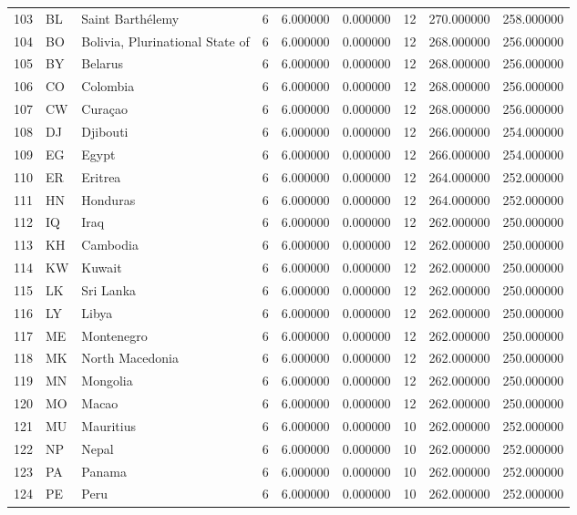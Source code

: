 \begin{tabular}{lllrrrrrr}
103 & BL & Saint Barthélemy & 6 & 6.000000 & 0.000000 & 12 & 270.000000 & 258.000000 \\
104 & BO & Bolivia, Plurinational State of & 6 & 6.000000 & 0.000000 & 12 & 268.000000 & 256.000000 \\
105 & BY & Belarus & 6 & 6.000000 & 0.000000 & 12 & 268.000000 & 256.000000 \\
106 & CO & Colombia & 6 & 6.000000 & 0.000000 & 12 & 268.000000 & 256.000000 \\
107 & CW & Curaçao & 6 & 6.000000 & 0.000000 & 12 & 268.000000 & 256.000000 \\
108 & DJ & Djibouti & 6 & 6.000000 & 0.000000 & 12 & 266.000000 & 254.000000 \\
109 & EG & Egypt & 6 & 6.000000 & 0.000000 & 12 & 266.000000 & 254.000000 \\
110 & ER & Eritrea & 6 & 6.000000 & 0.000000 & 12 & 264.000000 & 252.000000 \\
111 & HN & Honduras & 6 & 6.000000 & 0.000000 & 12 & 264.000000 & 252.000000 \\
112 & IQ & Iraq & 6 & 6.000000 & 0.000000 & 12 & 262.000000 & 250.000000 \\
113 & KH & Cambodia & 6 & 6.000000 & 0.000000 & 12 & 262.000000 & 250.000000 \\
114 & KW & Kuwait & 6 & 6.000000 & 0.000000 & 12 & 262.000000 & 250.000000 \\
115 & LK & Sri Lanka & 6 & 6.000000 & 0.000000 & 12 & 262.000000 & 250.000000 \\
116 & LY & Libya & 6 & 6.000000 & 0.000000 & 12 & 262.000000 & 250.000000 \\
117 & ME & Montenegro & 6 & 6.000000 & 0.000000 & 12 & 262.000000 & 250.000000 \\
118 & MK & North Macedonia & 6 & 6.000000 & 0.000000 & 12 & 262.000000 & 250.000000 \\
119 & MN & Mongolia & 6 & 6.000000 & 0.000000 & 12 & 262.000000 & 250.000000 \\
120 & MO & Macao & 6 & 6.000000 & 0.000000 & 12 & 262.000000 & 250.000000 \\
121 & MU & Mauritius & 6 & 6.000000 & 0.000000 & 10 & 262.000000 & 252.000000 \\
122 & NP & Nepal & 6 & 6.000000 & 0.000000 & 10 & 262.000000 & 252.000000 \\
123 & PA & Panama & 6 & 6.000000 & 0.000000 & 10 & 262.000000 & 252.000000 \\
124 & PE & Peru & 6 & 6.000000 & 0.000000 & 10 & 262.000000 & 252.000000 \\

\end{tabular}
